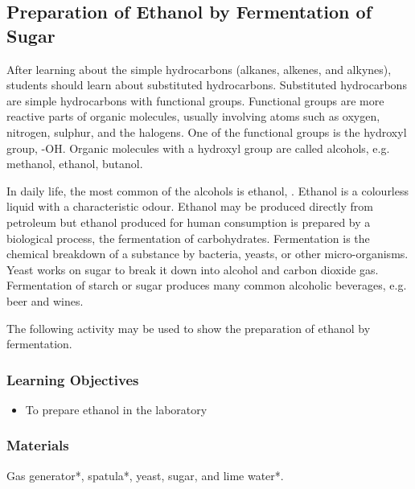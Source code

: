 \subsection{Preparation of Ethanol by Fermentation of Sugar}

After learning about the simple hydrocarbons (alkanes, alkenes, and alkynes), students should learn about substituted hydrocarbons. Substituted hydrocarbons are simple hydrocarbons with functional groups. Functional groups are more reactive parts of organic molecules, usually involving atoms such as oxygen, nitrogen, sulphur, and the halogens. One of the functional groups is the hydroxyl group, -OH. Organic molecules with a hydroxyl group are called alcohols, e.g. methanol, ethanol, butanol.

In daily life, the most common of the alcohols is ethanol, . Ethanol is a colourless liquid with a characteristic odour. Ethanol may be produced directly from petroleum but ethanol produced for human consumption is prepared by a biological process, the fermentation of carbohydrates. Fermentation is the chemical breakdown of a substance by bacteria, yeasts, or other micro-organisms. Yeast works on sugar to break it down into alcohol and carbon dioxide gas. Fermentation of starch or sugar produces many common alcoholic beverages, e.g. beer and wines.

The following activity may be used to show the preparation of ethanol by fermentation.

\subsubsection*{Learning Objectives}
\begin{itemize}
\item{To prepare ethanol in the laboratory}
\end{itemize}

\subsubsection*{Materials}
Gas generator*, spatula*, yeast, sugar, and lime water*.

